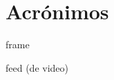 \chapter*{Acrónimos}
\label{chap:acro}


\begin{acronym}[Raspberry]
\end{acronym}

\begin{acronym}[2D]
\end{acronym}

\begin{acronym}[3D]
\end{acronym}

\begin{acronym}[ID]
\end{acronym}


frame

feed (de video)
